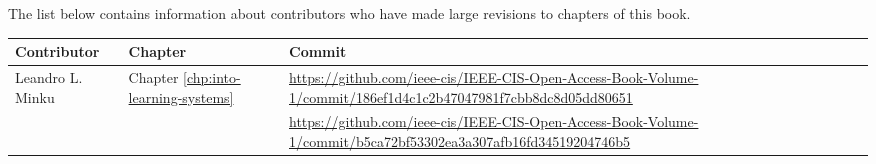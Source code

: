 
\contributors

The list below contains information about contributors who have made large revisions to chapters of this book.

\begin{center}
\begin{tabularx}{1.2\textwidth}{|l|l|X|} \hline
Contributor & Chapter & Commit \\ \hline
Leandro L. Minku & Chapter \ref{chp:into-learning-systems} & \url{https://github.com/ieee-cis/IEEE-CIS-Open-Access-Book-Volume-1/commit/186ef1d4c1c2b47047981f7cbb8dc8d05dd80651} \\ \cline{3-3} 
& & \url{https://github.com/ieee-cis/IEEE-CIS-Open-Access-Book-Volume-1/commit/b5ca72bf53302ea3a307afb16fd34519204746b5} \\ \hline

\end{tabularx}
\end{center}